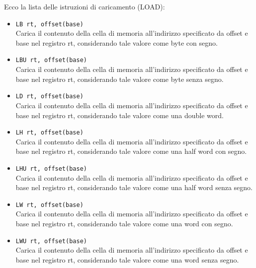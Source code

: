 \documentclass[12pt]{report}
\begin{document}
Ecco la lista delle istruzioni di caricamento (LOAD):

\begin{itemize}
	\item \texttt{LB rt, offset(base)}\\
	Carica il contenuto della cella di memoria all'indirizzo specificato da offset e base nel registro rt, 
	considerando tale valore come byte con segno.

	\item \texttt{LBU rt, offset(base)}\\
	Carica il contenuto della cella di memoria all'indirizzo specificato da offset e base nel registro rt, 
	considerando tale valore come byte senza segno.

	\item \texttt{LD rt, offset(base)}\\
	Carica il contenuto della cella di memoria all'indirizzo specificato da offset e base nel registro rt, 
	considerando tale valore come una double word.

	\item \texttt{LH rt, offset(base)}\\
	Carica il contenuto della cella di memoria all'indirizzo specificato da offset e base nel registro rt, 
	considerando tale valore come una half word con segno.

	\item \texttt{LHU rt, offset(base)}\\
	Carica il contenuto della cella di memoria all'indirizzo specificato da offset e base nel registro rt, 
	considerando tale valore come una half word senza segno.

	\item \texttt{LW rt, offset(base)}\\
	Carica il contenuto della cella di memoria all'indirizzo specificato da offset e base nel registro rt, 
	considerando tale valore come una word con segno.
	
	\item \texttt{LWU rt, offset(base)}\\
	Carica il contenuto della cella di memoria all'indirizzo specificato da offset e base nel registro rt, 
	considerando tale valore come una word senza segno.
\end{itemize}
\end{document}
